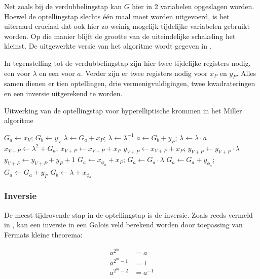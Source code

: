 Net zoals bij de verdubbelingstap kan $G$ hier in 2 variabelen opgeslagen worden. Hoewel de optellingstap slechts \'e\'en maal moet worden uitgevoerd, is het uiteraard cruciaal dat ook hier zo weinig mogelijk tijdelijke variabelen gebruikt worden. Op die manier blijft de grootte van de uiteindelijke schakeling het kleinst. De uitgewerkte versie van het algoritme wordt gegeven in .

In tegenstelling tot de verdubbelingstap zijn hier twee tijdelijke registers nodig, een voor $\lambda$ en een voor $a$. Verder zijn er twee registers nodig voor $x_P$ en $y_P$. Alles samen dienen er tien optellingen, drie vermenigvuldigingen, twee kwadrateringen en een inversie uitgerekend te worden.

\begin{algorithm}[h]
	\caption{Uitwerking van de optellingstap voor hyperelliptische krommen in het Miller algoritme}
	\label{algoritme-implementatie-miller-add-detail}
	$G_a \leftarrow x_V$; $G_b \leftarrow y_V$\;
	$\lambda \leftarrow G_a + x_P$; $\lambda \leftarrow \lambda^{-1}$\;
	$a \leftarrow G_b + y_P$; $\lambda \leftarrow \lambda \cdot a$\;
	$x_{V + P} \leftarrow \lambda ^2 + G_a$; $x_{V + P} \leftarrow x_{V + P} + x_P$\;
	$y_{V + P} \leftarrow x_{V + P} + x_P$; $y_{V + P} \leftarrow y_{V + P} \cdot \lambda$\;
	$y_{V + P} \leftarrow y_{V + P} + y_P + 1$\;
	$G_a \leftarrow x_{\phi_a} + x_P$; $G_a \leftarrow G_a \cdot \lambda$\;
	$G_a \leftarrow G_a + y_{\phi_a}$; $G_a \leftarrow G_a + y_P$\;
	$G_b \leftarrow \lambda + x_{\phi_a}$\;
\end{algorithm}

\subsubsection{Inversie}

De meest tijdrovende stap in de optellingstap is de inversie.  Zoals reeds vermeld in , kan een inversie in een Galois veld berekend worden door toepassing van Fermats kleine theorema:

\[\begin{aligned}
a^{2^m}		&= a\\
a^{2^m - 1}	&= 1\\
a^{2^m - 2}	&= a^{-1}\\
\end{aligned}\]

